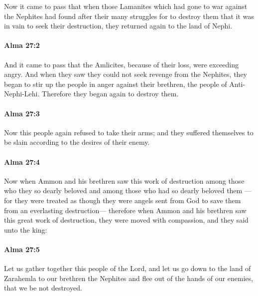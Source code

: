 			Now it came to pass that
			when those Lamanites which had gone to war against the Nephites had found
			after their many struggles for to destroy them
			that it was in vain to seek their destruction,
			they returned again to the land of Nephi.

		\paragraph{Alma 27:2} %
			\label{ALMA-27-2}

			And it came to pass that
			the Amlicites, because of their loss, were exceeding angry.
			And when they saw they could not seek revenge from the Nephites,
			they began to stir up the people in anger
			against their brethren, the people of Anti-Nephi-Lehi.
			Therefore they began again to destroy them.

		\paragraph{Alma 27:3} %
			\label{ALMA-27-3}

			Now this people again refused to take their arms;
			and they suffered themselves to be slain according to the desires of their enemy.

		\paragraph{Alma 27:4} %
			\label{ALMA-27-4}

			Now when Ammon and his brethren saw this work of destruction
			among those who they so dearly beloved
			and among those who had so dearly beloved them
			---for they were treated as though they were angels sent from God
			to save them from an everlasting destruction---
			therefore when Ammon and his brethren saw this great work of destruction,
			they were moved with compassion,
			and they said unto the king:

		\paragraph{Alma 27:5} %
			\label{ALMA-27-5}

			Let us gather together this people of the Lord,
			and let us go down to the land of Zarahemla to our brethren the Nephites
			and flee out of the hands of our enemies, that we be not destroyed.

